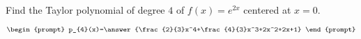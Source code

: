 \documentclass{ximera}
\author{Gregory Hartman \and Matthew Carr}
\begin{document}
\begin{exercise}




Find the Taylor polynomial of degree $4$ of $f(x)=e^{2x}$ centered at $x=0$.

\[
\begin{prompt}
p_{4}(x)=\answer{\frac{2}{3}x^4+\frac{4}{3}x^3+2x^2+2x+1}
\end{prompt}
\]

\end{exercise}
\end{document}
